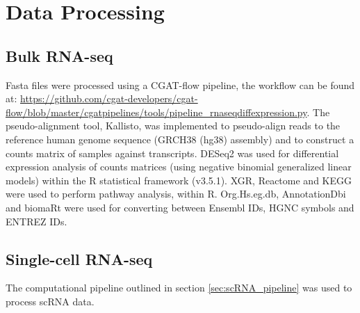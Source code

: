 %

\section{Data Processing}\label{sec:data_processing}
\subsection{Bulk RNA-seq}\label{subsec:bulk_data_pro}
Fasta files were processed using a CGAT-flow\cite{sims2014cgat} pipeline, the workflow can be found at: \url{https://github.com/cgat-developers/cgat-flow/blob/master/cgatpipelines/tools/pipeline_rnaseqdiffexpression.py}.
The pseudo-alignment tool, Kallisto\cite{bray2016near}, was implemented to pseudo-align reads to the reference human genome sequence (GRCH38 (hg38) assembly) and to construct a counts matrix of samples against transcripts.
DESeq2\cite{love2014moderated} was used for differential expression analysis of  counts  matrices  (using  negative  binomial  generalized  linear  models) within the R statistical framework (v3.5.1).
XGR\cite{fang2016xgr}, Reactome\cite{fabregat2017reactome} and KEGG\cite{kanehisa2017kegg} were used to perform pathway analysis, within R\@.
Org.Hs.eg.db\cite{carlson2019org}, AnnotationDbi\cite{pages2020annotationdbi} and biomaRt\cite{durinck2009mapping} were used for converting between Ensembl IDs, HGNC symbols and ENTREZ IDs.

\subsection{Single-cell RNA-seq}
The computational pipeline outlined in section \ref{sec:scRNA_pipeline} was used to process scRNA data.




